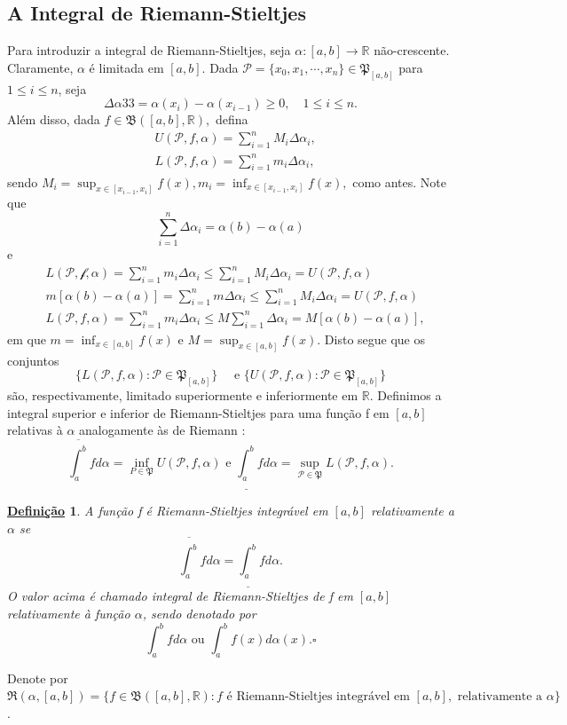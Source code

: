 \documentclass{article}
\newtheorem*{def*}{\underline{Defini\c c\~ao}}
\begin{document}
\subsection{A Integral de Riemann-Stieltjes}
Para introduzir a integral de Riemann-Stieltjes, seja \(\alpha :[a, b]\rightarrow \mathbb{R}\) não-crescente. Claramente, \(\alpha \) é limitada em \([a, b]\).
Dada \(\mathcal{P}=\{x_{0}, x_{1}, \cdots, x_{n}\}\in \mathfrak{P}_{[a, b]}\) para \(1\leq i\leq n\), seja 
  \[
    \Delta \alpha 33 = \alpha (x_{i}) - \alpha (x_{i-1})\geq 0,\quad 1\leq i\leq n.
  \]
  Além disso, dada \(f\in \mathfrak{B}([a, b], \mathbb{R}),\) defina 
 \begin{align*}
   &U(\mathcal{P}, f, \alpha ) = \sum\limits_{i=1}^{n}M_{i}\Delta \alpha_{i},\\
   &L(\mathcal{P}, f, \alpha ) = \sum\limits_{i=1}^{n}m_{i}\Delta \alpha_{i},
 \end{align*}
 sendo \(M_{i} = \sup_{x\in[x_{i-1}, x_{i}]}f(x), m_{i} = \inf_{x\in[x_{i-1}, x_{i}]}f(x),\) como antes.
 Note que 
   \[
     \sum\limits_{i=1}^{n}\Delta \alpha_{i} = \alpha (b) - \alpha (a)
   \]
  e 
 \begin{align*}
      &L(\mathcal{P, f, \alpha }) = \sum\limits_{i=1}^{n}m_{i}\Delta \alpha_{i}\leq \sum\limits_{i=1}^{n}M_{i}\Delta \alpha_{i} = U(\mathcal{P}, f, \alpha )\\
      &m[\alpha (b) - \alpha (a)] = \sum\limits_{i=1}^{n}m\Delta \alpha_{i}\leq \sum\limits_{i=1}^{n}M_{i}\Delta \alpha_{i} = U(\mathcal{P}, f, \alpha )\\
      &L(\mathcal{P}, f, \alpha ) = \sum\limits_{i=1}^{n}m_{i}\Delta \alpha_{i}\leq M \sum\limits_{i=1}^{n}\Delta \alpha_{i} = M[\alpha (b)-\alpha (a)],
 \end{align*}
 em que \(m = \inf_{x\in[a,b]}f(x)\) e \(M=\sup_{x\in[a, b]}f(x).\) Disto segue que os conjuntos 
   \[
     \{L(\mathcal{P}, f, \alpha ): \mathcal{P}\in \mathfrak{P}_{[a, b]}\}\quad\text{ e } \{U(\mathcal{P}, f, \alpha ): \mathcal{P}\in \mathfrak{P}_{[a, b]}\}
   \]
são, respectivamente, limitado superiormente e inferiormente em \(\mathbb{R}.\) Definimos a integral superior
e inferior de Riemann-Stieltjes para uma fun\c cão f em \([a, b]\) relativas à \(\alpha \) analogamente às de Riemann : 
  \[
    \overline{\int_{a}^{b}}f d\alpha =\inf_{P\in \mathfrak{P}}U(\mathcal{P}, f, \alpha ) \text{ e } \underline{\int_{a}^{b}}f d\alpha =\sup_{\mathcal{P}\in \mathfrak{P}}L(\mathcal{P}, f, \alpha ).
  \]
 \begin{def*}
   A fun\c cão f é Riemann-Stieltjes integrável em \([a, b]\) relativamente a \(\alpha \) se 
     \[
       \overline{\int_{a}^{b}}f d\alpha  = \underline{\int_{a}^{b}}fd\alpha .
     \]
     O valor acima é chamado integral de Riemann-Stieltjes de f em \([a, b]\) relativamente à fun\c cão \(\alpha \), sendo denotado por 
       \[
         \int_{a}^{b} f d\alpha \text{ ou } \int_{a}^{b} f(x) d\alpha (x). \square
       \]
 \end{def*}
 Denote por \(\mathfrak{R}(\alpha , [a, b]) = \{f\in \mathfrak{B}([a, b], \mathbb{R}): f\text{ é Riemann-Stieltjes integrável em }[a, b],\text{ relativamente a }\alpha \}\).
\end{document}
